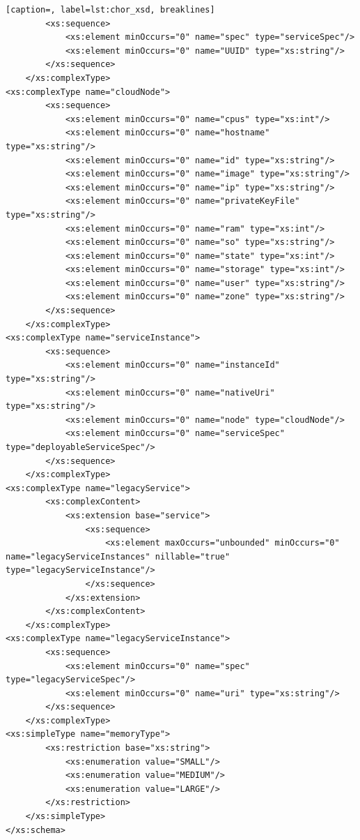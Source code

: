 {\begin{lstlisting}[caption=, label=lst:chor_xsd, breaklines]
        <xs:sequence>
            <xs:element minOccurs="0" name="spec" type="serviceSpec"/>
            <xs:element minOccurs="0" name="UUID" type="xs:string"/>
        </xs:sequence>
    </xs:complexType>
<xs:complexType name="cloudNode">
        <xs:sequence>
            <xs:element minOccurs="0" name="cpus" type="xs:int"/>
            <xs:element minOccurs="0" name="hostname" type="xs:string"/>
            <xs:element minOccurs="0" name="id" type="xs:string"/>
            <xs:element minOccurs="0" name="image" type="xs:string"/>
            <xs:element minOccurs="0" name="ip" type="xs:string"/>
            <xs:element minOccurs="0" name="privateKeyFile" type="xs:string"/>
            <xs:element minOccurs="0" name="ram" type="xs:int"/>
            <xs:element minOccurs="0" name="so" type="xs:string"/>
            <xs:element minOccurs="0" name="state" type="xs:int"/>
            <xs:element minOccurs="0" name="storage" type="xs:int"/>
            <xs:element minOccurs="0" name="user" type="xs:string"/>
            <xs:element minOccurs="0" name="zone" type="xs:string"/>
        </xs:sequence>
    </xs:complexType>
<xs:complexType name="serviceInstance">
        <xs:sequence>
            <xs:element minOccurs="0" name="instanceId" type="xs:string"/>
            <xs:element minOccurs="0" name="nativeUri" type="xs:string"/>
            <xs:element minOccurs="0" name="node" type="cloudNode"/>
            <xs:element minOccurs="0" name="serviceSpec" type="deployableServiceSpec"/>
        </xs:sequence>
    </xs:complexType>
<xs:complexType name="legacyService">
        <xs:complexContent>
            <xs:extension base="service">
                <xs:sequence>
                    <xs:element maxOccurs="unbounded" minOccurs="0" name="legacyServiceInstances" nillable="true" type="legacyServiceInstance"/>
                </xs:sequence>
            </xs:extension>
        </xs:complexContent>
    </xs:complexType>
<xs:complexType name="legacyServiceInstance">
        <xs:sequence>
            <xs:element minOccurs="0" name="spec" type="legacyServiceSpec"/>
            <xs:element minOccurs="0" name="uri" type="xs:string"/>
        </xs:sequence>
    </xs:complexType>
<xs:simpleType name="memoryType">
        <xs:restriction base="xs:string">
            <xs:enumeration value="SMALL"/>
            <xs:enumeration value="MEDIUM"/>
            <xs:enumeration value="LARGE"/>
        </xs:restriction>
    </xs:simpleType>
</xs:schema>
\end{lstlisting}
}
